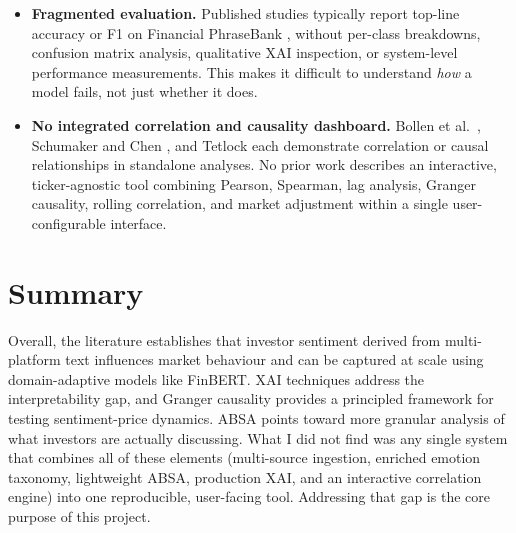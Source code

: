 \begin{itemize}
    \item \textbf{Fragmented evaluation.}
    Published studies typically report top-line accuracy or F1 on
    Financial PhraseBank \citep{malo2014financialphrasebank}, without
    per-class breakdowns, confusion matrix analysis, qualitative XAI
    inspection, or system-level performance measurements.
    This makes it difficult to understand \textit{how} a model fails, not
    just whether it does.

    \item \textbf{No integrated correlation and causality dashboard.}
    Bollen et al.\ \citeyearpar{bollen2011twitter}, Schumaker and Chen
    \citeyearpar{schumaker2009textmining}, and Tetlock
    \citeyearpar{tetlock2007giving} each demonstrate correlation or causal
    relationships in standalone analyses.  No prior work describes an
    interactive, ticker-agnostic tool combining Pearson, Spearman, lag
    analysis, Granger causality, rolling correlation, and market adjustment
    within a single user-configurable interface.
\end{itemize}

\section{Summary}

Overall, the literature establishes that investor sentiment derived from multi-platform text influences market behaviour and can be captured at scale using domain-adaptive models like FinBERT. XAI techniques address the interpretability gap, and Granger causality provides a principled framework for testing sentiment-price dynamics. ABSA points toward more granular analysis of what investors are actually discussing. What I did not find was any single system that combines all of these elements (multi-source ingestion, enriched emotion taxonomy, lightweight ABSA, production XAI, and an interactive correlation engine) into one reproducible, user-facing tool. Addressing that gap is the core purpose of this project.
